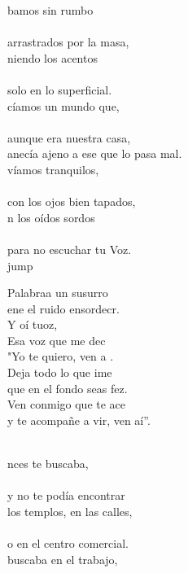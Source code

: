 \begin{cancion}%
	bamos sin rumbo  \\
	\jump\\
arrastrados por la masa,\\
	niendo los acentos \\
	\jump\\
solo en lo superficial.\\
	cíamos un mundo que, \\
	\jump\\
aunque era nuestra casa,\\
	anecía ajeno a ese que lo pasa mal.\\
	víamos tranquilos, \\
	\jump\\
con los ojos bien tapados,\\
	n los oídos sordos \\
	\jump\\
para no escuchar tu Voz.\\jump\\
	\begin{chorus}%
	 Palabraa un susurro \\
	ene el ruido ensordecr.\\
	Y oí tuoz,\\
	Esa voz que me dec \\
	"Yo te quiero, ven a . \\
	Deja todo lo que ime \\
	que en el fondo seas fez.\\
	Ven conmigo que te ace \\
	y te acompañe a vir, ven aí”.\\
	\end{chorus}%
	\jump\\
	nces te buscaba, \\
	\jump\\
y no te podía encontrar\\
	 los templos, en las calles, \\
	\jump\\
o en el centro comercial.\\
	 buscaba en el trabajo, \\

\end{cancion}
